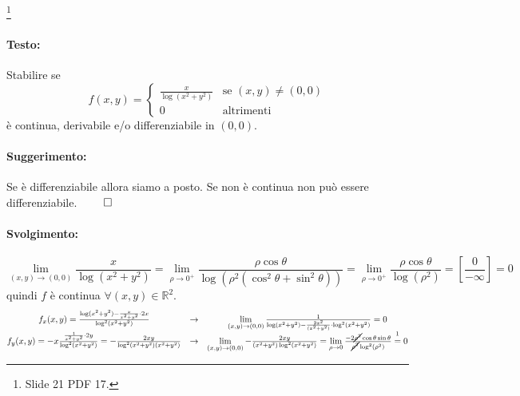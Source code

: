 \begin{example}
	\footnote{Slide 21 PDF 17.} 
	\paragraph{Testo:} Stabilire se
	\begin{equation*}
		f(x,y)=
		\begin{cases}
			\frac{x}{\log(x^2+y^2)}&\text{se } (x,y)\neq(0,0)\\
			0 &\text{altrimenti}
		\end{cases}
	\end{equation*}
	è continua, derivabile e/o differenziabile in $(0,0)$.
	\paragraph{Suggerimento:} Se è differenziabile allora siamo a posto. Se non è continua non può essere differenziabile. $\qed$
	\paragraph{Svolgimento:}
	\begin{equation*}
		\lim_{(x,y) \rightarrow(0,0)} \frac{x}{\log(x^2+y^2)} = \lim_{\rho\rightarrow0^+}\frac{\rho\cos\theta}{\log(\rho^2(\cos^2\theta+\sin^2\theta))}= \lim_{\rho\rightarrow 0^+} \frac{\rho\cos\theta}{\log(\rho^2)} = \left[\frac{0}{-\infty}\right] = 0
	\end{equation*}
	quindi $f$ è continua $\forall (x,y)\in\mathbb{R}^2$.
	\begin{equation*}
		\begin{matrix}
			f_x(x,y) = \frac{\log(x^2+y^2)-\frac{x}{x^2+y^2}\cdot 2x}{\log^2(x^2+y^2)} &\rightarrow& \lim\limits_{(x,y)\rightarrow(0,0)}  \frac{1}{\log(x^2+y^2) - \frac{2x^2}{(x^2+y^2)}\cdot\log^2(x^2+y^2)} = 0\\
			f_y(x,y)= -x\frac{\frac{1}{x^2+y^2}\cdot2y}{\log^2(x^2+y^2)} = -\frac{2xy}{\log^2(x^2+y^2)(x^2+y^2)} &\rightarrow& \lim\limits_{(x,y)\rightarrow(0,0)}-\frac{2xy}{(x^2+y^2)\log^2(x^2+y^2)} = \lim\limits_{\rho\rightarrow0}\frac{-2\cancel{\rho^2}\cos\theta\sin\theta}{\cancel{\rho^2}\log^2(\rho^2)} \overset{\footnotemark}{=} 0
		\end{matrix}
	\end{equation*}
\end{example}

